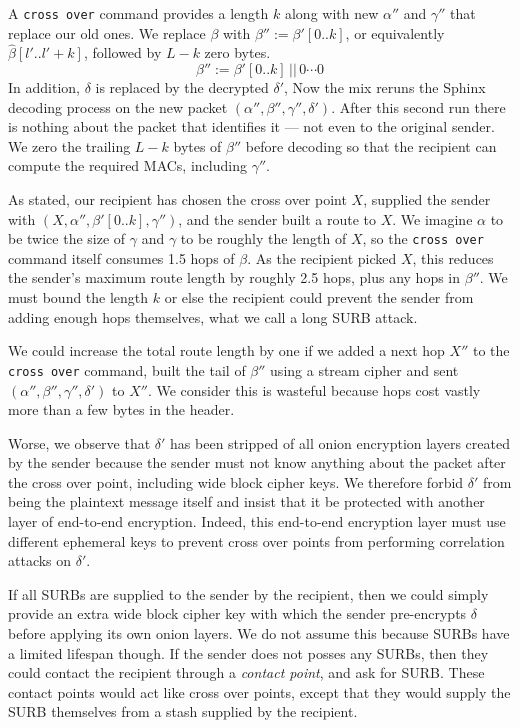 A {\tt cross over} command provides a length $k$ along with new
 $\alpha''$ and $\gamma''$ that replace our old ones. 
We replace $\beta$ with $\beta'' := \beta'[0..k]$, or equivalently
$\hat\beta[l'..l'+k]$, followed by $L-k$ zero bytes.
\[ \beta'' :=  \beta'[0..k] \,||\, 0\cdots0 \]
In addition, $\delta$ is replaced by the decrypted $\delta'$, 
Now the mix reruns the Sphinx decoding process on the new packet
$(\alpha'',\beta'',\gamma'',\delta')$. 
After this second run there is nothing about the packet that 
identifies it --- not even to the original sender.
We zero the trailing $L-k$ bytes of $\beta''$ before decoding so that
the recipient can compute the required MACs, including $\gamma''$.

As stated, our recipient has chosen the cross over point $X$,
supplied the sender with $(X,\alpha'',\beta'[0..k],\gamma'')$,
and the sender built a route to $X$.  We imagine $\alpha$ to be
twice the size of $\gamma$ and $\gamma$ to be roughly the length of
$X$, so the {\tt cross over} command itself consumes 1.5 hops of $\beta$.
As the recipient picked $X$, this reduces the sender's maximum route
length by roughly 2.5 hops, plus any hops in $\beta''$.
We must bound the length $k$ or else the recipient could prevent
the sender from adding enough hops themselves, what we call a
long SURB attack.

\smallskip 

We could increase the total route length by one if we added a next
hop $X''$ to the {\tt cross over} command, built the tail of $\beta''$
using a stream cipher and sent $(\alpha'',\beta'',\gamma'',\delta')$
to $X''$. We consider this is wasteful because hops cost vastly more
than a few bytes in the header.

Worse, we observe that $\delta'$ has been stripped of all onion
encryption layers created by the sender because the sender must not
know anything about the packet after the cross over point,
 including wide block cipher keys.
We therefore forbid $\delta'$ from being the plaintext message itself
and insist that it be protected with another layer of end-to-end
encryption.  Indeed, this end-to-end encryption layer must use
different ephemeral keys to prevent cross over points from performing
correlation attacks on $\delta'$.

If all SURBs are supplied to the sender by the recipient, then
we could simply provide an extra wide block cipher key with which
the sender pre-encrypts $\delta$ before applying its own onion layers.
We do not assume this because SURBs have a limited lifespan though.  
If the sender does not posses any SURBs, then they could contact the
recipient through a {\em contact point}, and ask for SURB. 
These contact points would act like cross over points, except
that they would supply the SURB themselves from a stash supplied by
the recipient.

